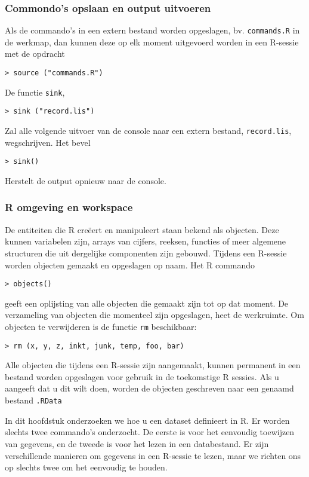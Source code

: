 \subsubsection{Commondo's opslaan en output uitvoeren}
Als de commando's in een extern bestand worden opgeslagen, bv. \texttt{commands.R} in de werkmap, dan kunnen deze op elk moment uitgevoerd worden in een R-sessie met de opdracht
\begin{lstlisting}
> source ("commands.R")
\end{lstlisting}
De functie \texttt{sink},
\begin{lstlisting}
> sink ("record.lis")
\end{lstlisting}
Zal alle volgende uitvoer van de console naar een extern bestand, \texttt{record.lis}, wegschrijven. Het bevel
\begin{lstlisting}
> sink()
\end{lstlisting}
Herstelt de output  opnieuw naar de console.

\subsubsection{R omgeving en workspace}
De entiteiten die R creëert en manipuleert staan bekend als objecten. Deze kunnen variabelen zijn, arrays
van cijfers, reeksen, functies of meer algemene structuren die uit dergelijke componenten zijn gebouwd.
Tijdens een R-sessie worden objecten gemaakt en opgeslagen op naam.
Het R commando
\begin{lstlisting}
> objects()
\end{lstlisting}
geeft een oplijsting van alle objecten die gemaakt zijn tot op dat moment.
De verzameling van objecten die momenteel zijn opgeslagen, heet de werkruimte.
Om objecten te verwijderen is de functie \texttt{rm} beschikbaar:
\begin{lstlisting}
> rm (x, y, z, inkt, junk, temp, foo, bar)
\end{lstlisting}
Alle objecten die tijdens een R-sessie zijn aangemaakt, kunnen permanent in een bestand worden opgeslagen voor gebruik in de toekomstige
R sessies. Als u aangeeft dat u dit wilt doen, worden de objecten geschreven naar een genaamd bestand \texttt{.RData}


In dit hoofdstuk onderzoeken we hoe u een dataset definieert in R. Er worden slechts twee commando's onderzocht. De eerste is voor het eenvoudig toewijzen van gegevens, en de tweede is voor het lezen in een databestand. Er zijn verschillende manieren om gegevens in een R-sessie te lezen, maar we richten ons op slechts twee om het eenvoudig te houden.
